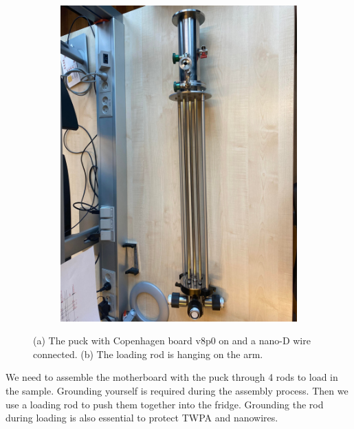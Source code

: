 \begin{figure}[h!]
\begin{subfigure}[b]{0.45\textwidth}
         \includegraphics[width=\textwidth]{Pic/Loadrod_2.jpg}
         \caption{}
         \label{}
     \end{subfigure}
    \caption{(a) The puck with Copenhagen board v8p0 on and a nano-D wire connected. (b) The loading rod is hanging on the arm.}
    \label{}
\end{figure}

We need to assemble the motherboard with the puck through 4 rods to load in the sample. Grounding yourself is required during the assembly process. Then we use a loading rod to push them together into the fridge. Grounding the rod during loading is also essential to protect TWPA and nanowires.

